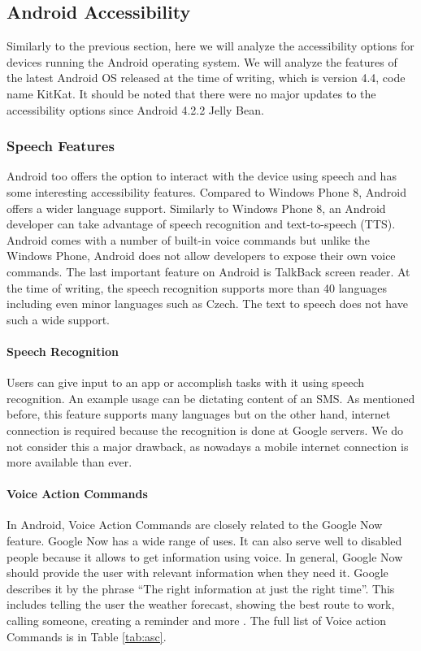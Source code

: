 \subsection{Android Accessibility}
Similarly to the previous section, here we will analyze the accessibility options for devices running the Android operating system. We will analyze the features of the latest Android OS released at the time of writing, which is version 4.4, code name KitKat. It should be noted that there were no major updates to the accessibility options since Android 4.2.2 Jelly Bean.

\subsubsection{Speech Features}
Android too offers the option to interact with the device using speech and has some interesting accessibility features. Compared to Windows Phone 8, Android offers a wider language support. Similarly to Windows Phone 8, an Android developer can take advantage of speech recognition and text-to-speech (TTS). Android comes with a number of built-in voice commands but unlike the Windows Phone, Android does not allow developers to expose their own voice commands. The last important feature on Android is TalkBack screen reader.
At the time of writing, the speech recognition supports more than 40 languages including even minor languages such as Czech. The text to speech does not have such a wide support.

\paragraph{Speech Recognition}
Users can give input to an app or accomplish tasks with it using speech recognition. An example usage can be dictating content of an SMS. As mentioned before, this feature supports many languages but on the other hand, internet connection is required \cite{androidRecog} because the recognition is done at Google servers. We do not consider this a major drawback, as nowadays a mobile internet connection is more available than ever.

\paragraph{Voice Action Commands}
In Android, Voice Action Commands are closely related to the Google Now feature. Google Now has a wide range of uses. It can also serve well to disabled people because it allows to get information using voice.
In general, Google Now should provide the user with relevant information when they need it. Google describes it by the phrase “The right information at just the right time”. This includes telling the user the weather forecast, showing the best route to work, calling someone, creating a reminder and more \cite{googleNow}. The full list of Voice action Commands is in Table \ref{tab:asc}.

